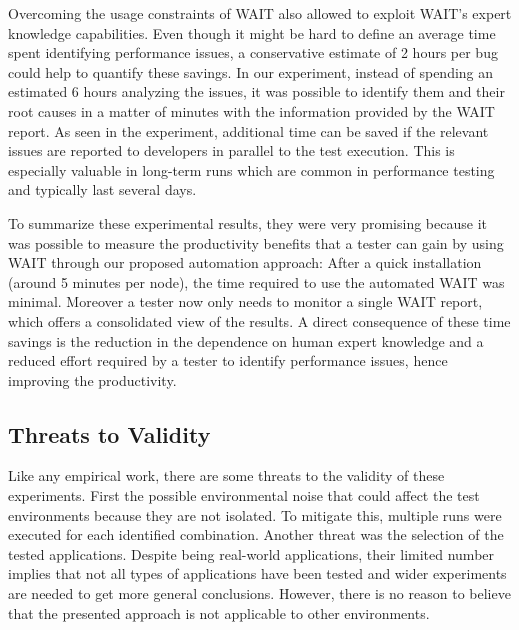 \documentclass[runningheads,a4paper]{llncs}
\newcommand{\myspaceM}{-7.6pt}
\begin{document}
Overcoming the usage constraints of WAIT also allowed to exploit
WAIT's expert knowledge capabilities. Even though it might be hard to define an
average time spent identifying performance issues, a conservative estimate of
2 hours per bug could help to quantify these savings. In our experiment,
instead of spending an estimated 6 hours analyzing the issues, it was
possible to identify them and their root causes in a matter of minutes with the 
information provided by the WAIT report. As seen in the experiment, additional
time can be saved if the relevant issues are reported to developers in parallel to
the test execution. This is especially valuable in long-term runs which
are common in performance testing and typically last several days.

To summarize these experimental results, they were very promising because it
was possible to measure the productivity benefits that a tester can gain by using
WAIT through our proposed automation approach: After a quick installation
(around 5 minutes per node), the time required to use the automated WAIT was
minimal. Moreover a tester now only needs to monitor a single WAIT report, which
offers a consolidated view of the results. A direct consequence of these
time savings is the reduction in the dependence on human expert knowledge and
a reduced effort required by a tester to identify performance issues, hence
improving the productivity.

\vspace{\myspaceM{}}
\subsection{Threats to Validity}
\vspace{\myspaceM{}}
Like any empirical work, there are some threats to the validity of these
experiments. First the possible environmental noise that could affect the test
environments because they are not isolated. To mitigate this, multiple runs were
executed for each identified combination. Another threat was the selection of
the tested applications. Despite being real-world applications, their limited
number implies that not all types of applications have been tested and wider
experiments are needed to get more general conclusions. However, there is no
reason to believe that the presented approach is not applicable to other
environments.

\end{document}
